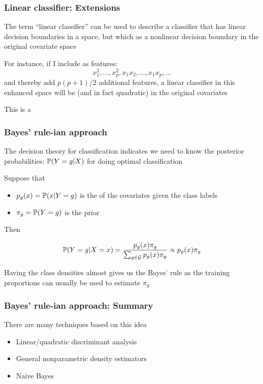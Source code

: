\documentclass[12pt]{beamer}
\begin{document}
\begin{frame}
\frametitle{Linear classifier: Extensions}
The term ``linear classifier'' can be used to describe a classifier that has linear decision boundaries
in a  space, but which as a nonlinear decision boundary in the original
covariate space

\vsp
For instance, if I include as features:
\[
x_1^2, \ldots, x_p^2, x_1x_2, \ldots, x_1x_p, \ldots 
\]
and thereby add $p(p+1)/2$ additional features, a linear classifier 
in this enhanced space will be  (and in fact quadratic) in
the original covariates

\vsp
This is a 
\end{frame}

\begin{frame}
\frametitle{Bayes' rule-ian approach}
The decision theory for classification indicates we need to know
the posterior probabilities: $\P(Y = g | X)$ for doing optimal classification

\vsp
Suppose that
\begin{itemize}
\item $p_g(x) = \P(x | Y = g)$ is the  of the covariates
given the class labels 
\item$\pi_g = \P(Y=g)$ is the prior
\end{itemize}

Then

\[
\P(Y = g | X = x) = \frac{p_g(x) \pi_g}{\sum_{g \in \mathcal{G}}p_g(x) \pi_g}  \propto p_g(x) \pi_g
\]

 Having the class densities almost gives us the Bayes' rule as 
the training proportions can usually be used to estimate $\pi_g$

\end{frame}

\begin{frame}
\frametitle{Bayes' rule-ian approach: Summary}
There are many techniques based on this idea
\begin{itemize}
\item Linear/quadratic discriminant analysis

\item General nonparametric density estimators
\item Naive Bayes

\end{itemize}
\end{frame}
\end{document}

